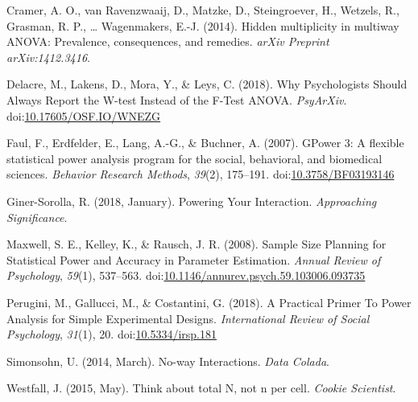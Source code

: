 \documentclass[,jou, draftfirst, a4paper,floatsintext]{apa6}
\begin{document}
\leavevmode\hypertarget{ref-cramer_hidden_2014}{}%
Cramer, A. O., van Ravenzwaaij, D., Matzke, D., Steingroever, H., Wetzels, R., Grasman, R. P., \ldots{} Wagenmakers, E.-J. (2014). Hidden multiplicity in multiway ANOVA: Prevalence, consequences, and remedies. \emph{arXiv Preprint arXiv:1412.3416}.

\leavevmode\hypertarget{ref-delacre_why_2018}{}%
Delacre, M., Lakens, D., Mora, Y., \& Leys, C. (2018). Why Psychologists Should Always Report the W-test Instead of the F-Test ANOVA. \emph{PsyArXiv}. doi:\href{https://doi.org/10.17605/OSF.IO/WNEZG}{10.17605/OSF.IO/WNEZG}

\leavevmode\hypertarget{ref-faul_gpower_2007}{}%
Faul, F., Erdfelder, E., Lang, A.-G., \& Buchner, A. (2007). GPower 3: A flexible statistical power analysis program for the social, behavioral, and biomedical sciences. \emph{Behavior Research Methods}, \emph{39}(2), 175--191. doi:\href{https://doi.org/10.3758/BF03193146}{10.3758/BF03193146}

\leavevmode\hypertarget{ref-giner-sorolla_powering_2018}{}%
Giner-Sorolla, R. (2018, January). Powering Your Interaction. \emph{Approaching Significance}.

\leavevmode\hypertarget{ref-maxwell_sample_2008}{}%
Maxwell, S. E., Kelley, K., \& Rausch, J. R. (2008). Sample Size Planning for Statistical Power and Accuracy in Parameter Estimation. \emph{Annual Review of Psychology}, \emph{59}(1), 537--563. doi:\href{https://doi.org/10.1146/annurev.psych.59.103006.093735}{10.1146/annurev.psych.59.103006.093735}

\leavevmode\hypertarget{ref-perugini_practical_2018}{}%
Perugini, M., Gallucci, M., \& Costantini, G. (2018). A Practical Primer To Power Analysis for Simple Experimental Designs. \emph{International Review of Social Psychology}, \emph{31}(1), 20. doi:\href{https://doi.org/10.5334/irsp.181}{10.5334/irsp.181}

\leavevmode\hypertarget{ref-simonsohn_no-way_2014}{}%
Simonsohn, U. (2014, March). No-way Interactions. \emph{Data Colada}.

\leavevmode\hypertarget{ref-westfall_think_2015}{}%
Westfall, J. (2015, May). Think about total N, not n per cell. \emph{Cookie Scientist}.
\end{document}
